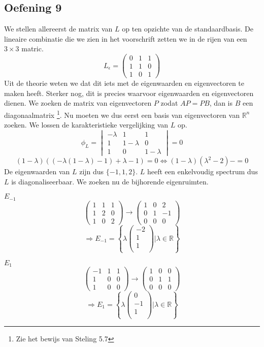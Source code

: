 \documentclass[lineaire_algebra_oplossingen.tex]{subfiles}
\begin{document}
\subsection{Oefening 9}
We stellen allereerst de matrix van $L$ op ten opzichte van de standaardbasis. De lineaire combinatie die we zien in het voorschrift zetten we in de rijen van een $3\times 3$ matric.
\[
L_\epsilon = 
\begin{pmatrix}
0 & 1 & 1\\
1 & 1 & 0\\
1 & 0 & 1
\end{pmatrix}
\]
Uit de theorie weten we dat dit iets met de eigenwaarden en eigenvectoren te maken heeft. Sterker nog, dit is precies waarvoor eigenwaarden en eigenvectoren dienen. We zoeken de matrix van eigenvectoren $P$ zodat $AP = PB$, dan is $B$ een diagonaalmatrix \footnote{Zie het bewijs van Steling 5.7}.
Nu moeten we dus eerst een basis van eigenvectoren van $\mathbb{R}^n$ zoeken.
We lossen de karakteristieke vergelijking van $L$ op.
\[
\phi_L = 
\begin{vmatrix}
-\lambda & 1 & 1\\
1 & 1-\lambda & 0\\
1 & 0 & 1-\lambda
\end{vmatrix}
= 0
\]
\[
(1-\lambda)((-\lambda(1-\lambda)-1) +\lambda-1) = 0 \Leftrightarrow (1-\lambda)(\lambda^2-2)-=0
\]
De eigenwaarden van $L$ zijn dus $\{-1,1,2\}$. $L$ heeft een enkelvoudig spectrum dus $L$ is diagonaliseerbaar.
We zoeken nu de bijhorende eigenruimten.

\emph{$E_{-1}$}\\
\[
\begin{pmatrix}
1 & 1 & 1\\
1 & 2 & 0\\
1 & 0 & 2
\end{pmatrix}
\rightarrow
\begin{pmatrix}
1 & 0 & 2\\
0 & 1 & -1\\
0 & 0 & 0
\end{pmatrix}
\]
\[
\Rightarrow E_{-1} = 
\left\{ 
\lambda
\begin{pmatrix}
-2\\1\\1\\
\end{pmatrix}
| \lambda \in \mathbb{R}
\right\}
\]

\emph{$E_1$}\\
\[
\begin{pmatrix}
-1 & 1 & 1\\
1 & 0 & 0\\
1 & 0 & 0
\end{pmatrix}
\rightarrow
\begin{pmatrix}
1 & 0 & 0\\
0 & 1 & 1\\
0 & 0 & 0
\end{pmatrix}
\]
\[
\Rightarrow E_1 = 
\left\{ 
\lambda
\begin{pmatrix}
0\\-1\\1\\
\end{pmatrix}
| \lambda \in \mathbb{R}
\right\}
\]
\end{document}
